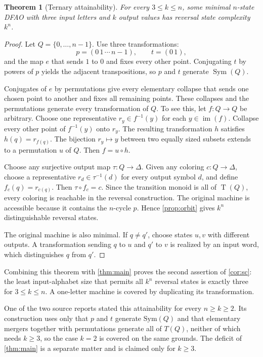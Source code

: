 \documentclass[11pt,a4paper]{article}
\numberwithin{equation}{section}
\newtheorem{theorem}{Theorem}[section]
\theoremstyle{definition}
\theoremstyle{remark}
\newcommand{\D}{\Delta}
\newcommand{\Sym}{\operatorname{Sym}}
\newcommand{\im}{\operatorname{im}}
\newcommand{\TQ}{\operatorname{T}(Q)}
\begin{document}
\begin{theorem}[Ternary attainability]\label{thm:ternary}
For every $3\le k\le n$, some minimal $n$-state DFAO with three input letters
and $k$ output values has reversal state complexity $k^n$.
\end{theorem}
\begin{proof}
Let $Q=\{0,\ldots,n-1\}$. Use three transformations:
\[
 p=(0\,1\,\cdots\,n-1),\qquad t=(0\,1),
\]
and the map $e$ that sends $1$ to $0$ and fixes every other point.
Conjugating $t$ by powers of $p$ yields the adjacent transpositions, so $p$
and $t$ generate $\Sym(Q)$.

Conjugates of $e$ by permutations give every elementary collapse that sends
one chosen point to another and fixes all remaining points. These collapses
and the permutations generate every transformation of $Q$. To see this,
let $f:Q\to Q$ be arbitrary. Choose one representative $r_y\in f^{-1}(y)$
for each $y\in\im(f)$. Collapse every other point of $f^{-1}(y)$ onto $r_y$.
The resulting transformation $h$ satisfies $h(q)=r_{f(q)}$. The bijection
$r_y\mapsto y$ between two equally sized subsets extends to a permutation
$u$ of $Q$. Then $f=u\circ h$.

Choose any surjective output map $\tau:Q\to\D$. Given any coloring
$c:Q\to\D$, choose a representative $r_d\in\tau^{-1}(d)$ for every output
symbol $d$, and define $f_c(q)=r_{c(q)}$. Then $\tau\circ f_c=c$.
Since the transition monoid is all of $\TQ$, every coloring is reachable in
the reversal construction. The original machine is accessible because it
contains the $n$-cycle $p$. Hence \cref{prop:orbit} gives $k^n$ distinguishable
reversal states.

The original machine is also minimal. If $q\ne q'$, choose states $u,v$
with different outputs. A transformation sending $q$ to $u$ and $q'$ to $v$
is realized by an input word, which distinguishes $q$ from $q'$.
\end{proof}

Combining this theorem with \cref{thm:main} proves the second assertion of
\cref{cor:sc}: the least input-alphabet size that permits all $k^n$ reversal
states is exactly three for $3\le k\le n$. A one-letter machine is covered by
duplicating its transformation.

\begin{remark}\label{rem:ternary-two}
One of the two source reports stated this attainability for every $n\ge k\ge2$.
Its construction uses only that $p$ and $t$ generate $\mathrm{Sym}(Q)$ and that
elementary mergers together with permutations generate all of $T(Q)$, neither
of which needs $k\ge3$, so the case $k=2$ is covered on the same grounds. The
deficit of \cref{thm:main} is a separate matter and is claimed only for
$k\ge3$.
\end{remark}
\end{document}
